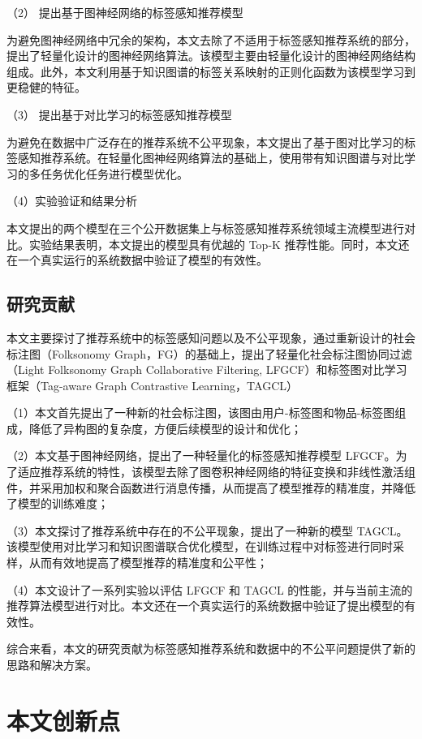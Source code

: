 （2） 提出基于图神经网络的标签感知推荐模型

为避免图神经网络中冗余的架构，本文去除了不适用于标签感知推荐系统的部分，提出了轻量化设计的图神经网络算法。该模型主要由轻量化设计的图神经网络结构组成。此外，本文利用基于知识图谱的标签关系映射的正则化函数为该模型学习到更稳健的特征。

（3） 提出基于对比学习的标签感知推荐模型

为避免在数据中广泛存在的推荐系统不公平现象，本文提出了基于图对比学习的标签感知推荐系统。在轻量化图神经网络算法的基础上，使用带有知识图谱与对比学习的多任务优化任务进行模型优化。

（4）实验验证和结果分析

本文提出的两个模型在三个公开数据集上与标签感知推荐系统领域主流模型进行对比。实验结果表明，本文提出的模型具有优越的 Top-K 推荐性能。同时，本文还在一个真实运行的系统数据中验证了模型的有效性。

\subsection{研究贡献} %

本文主要探讨了推荐系统中的标签感知问题以及不公平现象，通过重新设计的社会标注图（Folksonomy Graph，FG）的基础上，提出了轻量化社会标注图协同过滤（Light Folksonomy Graph Collaborative Filtering, LFGCF）和标签图对比学习框架（Tag-aware Graph Contrastive Learning，TAGCL）

（1）本文首先提出了一种新的社会标注图，该图由用户-标签图和物品-标签图组成，降低了异构图的复杂度，方便后续模型的设计和优化；

（2）本文基于图神经网络，提出了一种轻量化的标签感知推荐模型 LFGCF。为了适应推荐系统的特性，该模型去除了图卷积神经网络的特征变换和非线性激活组件，并采用加权和聚合函数进行消息传播，从而提高了模型推荐的精准度，并降低了模型的训练难度；

（3）本文探讨了推荐系统中存在的不公平现象，提出了一种新的模型 TAGCL。该模型使用对比学习和知识图谱联合优化模型，在训练过程中对标签进行同时采样，从而有效地提高了模型推荐的精准度和公平性；

（4）本文设计了一系列实验以评估 LFGCF 和 TAGCL 的性能，并与当前主流的推荐算法模型进行对比。本文还在一个真实运行的系统数据中验证了提出模型的有效性。

综合来看，本文的研究贡献为标签感知推荐系统和数据中的不公平问题提供了新的思路和解决方案。

\section{本文创新点} %

